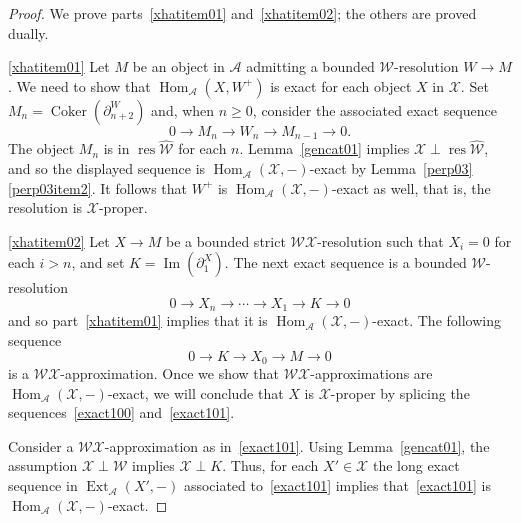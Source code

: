 \documentclass{amsart}
\begin{document}
\begin{proof}
We prove parts~\eqref{xhatitem01} and~\eqref{xhatitem02};  
the others are proved dually.

\eqref{xhatitem01}
Let $M$ be an object in ${{\mathcal{{A}}}}$ 
admitting a bounded ${{\mathcal{{W}}}}$-resolution $W\to M$.
We need to show that ${{\operatorname{Hom}}_{{\mathcal{{A}}}}}(X,W^+)$ is exact for each
object $X$ in ${{\mathcal{{X}}}}$.
Set $M_n={\operatorname{Coker}}(\partial^W_{n+2})$ and, when $n{\geqslant} 0$, consider the 
associated exact sequence 
\begin{equation*} 
0\to M_n\to W_{n}\to M_{n-1}\to 0.
\end{equation*}
The object $M_n$ is in ${{\operatorname{res}{\widehat{{{\mathcal{{{W}}}}}}}}}$ for each $n$.
Lemma~\ref{gencat01} implies 
${{\mathcal{{X}}}}\perp{{\operatorname{res}{\widehat{{{\mathcal{{{W}}}}}}}}}$, and so the displayed sequence is ${{\operatorname{Hom}}_{{\mathcal{{A}}}}}({{\mathcal{{X}}}},-)$-exact
by Lemma~\ref{perp03}\eqref{perp03item2}.
It follows that  $W^+$ is ${{\operatorname{Hom}}_{{\mathcal{{A}}}}}({{\mathcal{{X}}}},-)$-exact as well,
that is, the resolution is ${{\mathcal{{X}}}}$-proper.

\eqref{xhatitem02}
Let $X\to M$ be a bounded strict ${{\mathcal{{W}}}}{{\mathcal{{X}}}}$-resolution
such that $X_i=0$ for each $i>n$, and set
$K={\operatorname{Im}}(\partial^X_1)$.  
The next exact sequence is a bounded ${{\mathcal{{W}}}}$-resolution
\begin{equation} \label{exact100}
0\to X_n\to\cdots\to X_1\to K\to 0
\end{equation}
and so part~\eqref{xhatitem01}
implies that it is ${{\operatorname{Hom}}_{{\mathcal{{A}}}}}({{\mathcal{{X}}}},-)$-exact.
The following sequence
\begin{equation} \label{exact101}
0\to K\to X_0\to M\to 0
\end{equation}
is a ${{\mathcal{{W}}}}{{\mathcal{{X}}}}$-approximation.
Once we show that ${{\mathcal{{W}}}}{{\mathcal{{X}}}}$-approximations are
${{\operatorname{Hom}}_{{\mathcal{{A}}}}}({{\mathcal{{X}}}},-)$-exact, we will conclude that 
$X$ is ${{\mathcal{{X}}}}$-proper by splicing the sequences~\eqref{exact100}
and~\eqref{exact101}.

Consider a ${{\mathcal{{W}}}}{{\mathcal{{X}}}}$-approximation
as in~\eqref{exact101}.
Using Lemma~\ref{gencat01},
the assumption ${{\mathcal{{X}}}}\perp{{\mathcal{{W}}}}$ implies ${{\mathcal{{X}}}}\perp K$.  
Thus, for each $X'\in{{\mathcal{{X}}}}$
the long exact sequence in ${{\operatorname{Ext}}_{{\mathcal{{A}}}}}(X',-)$
associated to~\eqref{exact101} implies that~\eqref{exact101} is ${{\operatorname{Hom}}_{{\mathcal{{A}}}}}({{\mathcal{{X}}}},-)$-exact.
\end{proof}
\end{document}
